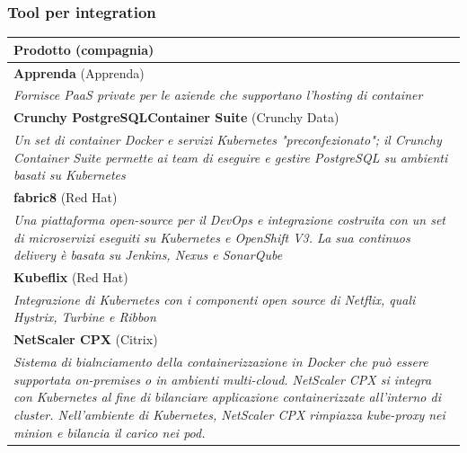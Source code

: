 \documentclass[12pt, a4paper]{report}
\begin{document}
\subsubsection{Tool per integration}
\begin{table}[ht]
\small
\centering
\begin{tabularx}{\textwidth}{|l|}
\hline
\textbf{Prodotto} (compagnia) \\
\hline
\textbf{Apprenda} (Apprenda)\\
\multicolumn{1}{|X|}{\textit{Fornisce PaaS private per le aziende che supportano l'hosting di container}}\\
\hline
\textbf{Crunchy PostgreSQLContainer Suite} (Crunchy Data)\\
\multicolumn{1}{|X|}{\textit{Un set di container Docker e servizi Kubernetes "preconfezionato"; il Crunchy Container Suite permette ai team di eseguire e gestire PostgreSQL su ambienti basati su Kubernetes}}\\
\hline
\textbf{fabric8} (Red Hat)\\
\multicolumn{1}{|X|}{\textit{Una piattaforma open-source per il DevOps e integrazione costruita con un set di microservizi eseguiti su Kubernetes e OpenShift V3. La sua continuos delivery è basata su Jenkins, Nexus e SonarQube}}\\
\hline
\textbf{Kubeflix} (Red Hat)\\
\multicolumn{1}{|X|}{\textit{Integrazione di Kubernetes con i componenti open source di Netflix, quali Hystrix, Turbine e Ribbon}}\\
\hline
\textbf{NetScaler CPX} (Citrix)\\
\multicolumn{1}{|X|}{\textit{Sistema di bialnciamento della containerizzazione in Docker che può essere supportata on-premises o in ambienti multi-cloud. NetScaler CPX si integra con Kubernetes al fine di bilanciare applicazione containerizzate all'interno di cluster. Nell'ambiente di Kubernetes, NetScaler CPX rimpiazza kube-proxy nei minion e bilancia il carico nei pod. }}\\
\hline
\end{tabularx}
\end{table}
\newpage
\end{document}
